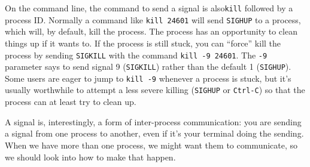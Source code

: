On the command line, the command to send a signal is also\texttt{kill} followed by a process ID. Normally a command like \texttt{kill 24601} will send \texttt{SIGHUP} to a process, which will, by default, kill the process. The process has an opportunity to clean things up if it wants to. If the process is still stuck, you can ``force'' kill the process by sending \texttt{SIGKILL} with the command \texttt{kill -9 24601}. The \texttt{-9} parameter says to send signal 9 (\texttt{SIGKILL}) rather than the default 1 (\texttt{SIGHUP}). Some users are eager to jump to \texttt{kill -9} whenever a process is stuck, but it's usually worthwhile to attempt a less severe killing (\texttt{SIGHUP} or \texttt{Ctrl-C}) so that the process can at least try to clean up.


A signal is, interestingly, a form of inter-process communication: you are sending a signal from one process to another, even if it's your terminal doing the sending. When we have more than one process, we might want them to communicate, so we should look into how to make that happen.




